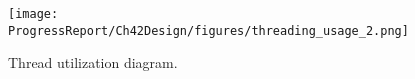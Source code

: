 \begin{figure}[ht]
    \centering
    \centerline{\texttt{[image: ProgressReport/Ch42Design/figures/threading\_usage\_2.png]}}
    \caption{Thread utilization diagram.}
    \label{fig:CurrentSwimlane}
\end{figure}